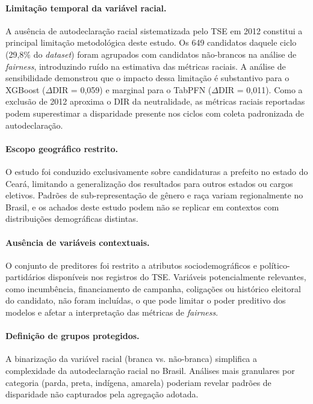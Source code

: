 \documentclass[12pt]{article}
\begin{document}
\paragraph{Limitação temporal da variável racial.} A ausência de autodeclaração racial sistematizada pelo TSE em 2012 constitui a principal limitação metodológica deste estudo. Os 649 candidatos daquele ciclo (29,8\% do \textit{dataset}) foram agrupados com candidatos não-brancos na análise de \textit{fairness}, introduzindo ruído na estimativa das métricas raciais. A análise de sensibilidade demonstrou que o impacto dessa limitação é substantivo para o XGBoost ($\Delta$DIR = 0,059) e marginal para o TabPFN ($\Delta$DIR = 0,011). Como a exclusão de 2012 aproxima o DIR da neutralidade, as métricas raciais reportadas podem superestimar a disparidade presente nos ciclos com coleta padronizada de autodeclaração.

\paragraph{Escopo geográfico restrito.} O estudo foi conduzido exclusivamente sobre candidaturas a prefeito no estado do Ceará, limitando a generalização dos resultados para outros estados ou cargos eletivos. Padrões de sub-representação de gênero e raça variam regionalmente no Brasil, e os achados deste estudo podem não se replicar em contextos com distribuições demográficas distintas.

\paragraph{Ausência de variáveis contextuais.} O conjunto de preditores foi restrito a atributos sociodemográficos e político-partidários disponíveis nos registros do TSE. Variáveis potencialmente relevantes, como incumbência, financiamento de campanha, coligações ou histórico eleitoral do candidato, não foram incluídas, o que pode limitar o poder preditivo dos modelos e afetar a interpretação das métricas de \textit{fairness}.

\paragraph{Definição de grupos protegidos.} A binarização da variável racial (branca vs. não-branca) simplifica a complexidade da autodeclaração racial no Brasil. Análises mais granulares por categoria (parda, preta, indígena, amarela) poderiam revelar padrões de disparidade não capturados pela agregação adotada.
\end{document}
